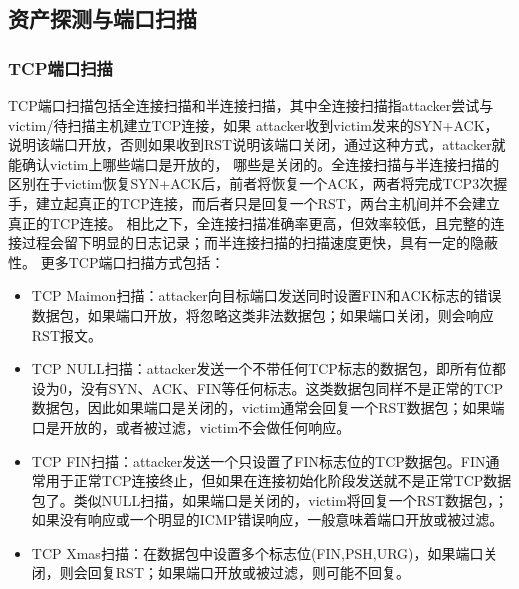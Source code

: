 \subsection{资产探测与端口扫描}
\subsubsection{TCP端口扫描}
TCP端口扫描包括全连接扫描和半连接扫描，其中全连接扫描指attacker尝试与victim/待扫描主机建立TCP连接，如果
attacker收到victim发来的SYN+ACK，说明该端口开放，否则如果收到RST说明该端口关闭，通过这种方式，attacker就能确认victim上哪些端口是开放的，
哪些是关闭的。全连接扫描与半连接扫描的区别在于victim恢复SYN+ACK后，前者将恢复一个ACK，两者将完成TCP3次握手，建立起真正的TCP连接，而后者只是回复一个RST，两台主机间并不会建立真正的TCP连接。
相比之下，全连接扫描准确率更高，但效率较低，且完整的连接过程会留下明显的日志记录；而半连接扫描的扫描速度更快，具有一定的隐蔽性。
更多TCP端口扫描方式包括：
\begin{itemize}
    \item TCP Maimon扫描：attacker向目标端口发送同时设置FIN和ACK标志的错误数据包，如果端口开放，将忽略这类非法数据包；如果端口关闭，则会响应RST报文。
    \item TCP NULL扫描：attacker发送一个不带任何TCP标志的数据包，即所有位都设为0，没有SYN、ACK、FIN等任何标志。这类数据包同样不是正常的TCP数据包，因此如果端口是关闭的，victim通常会回复一个RST数据包；如果端口是开放的，或者被过滤，victim不会做任何响应。
    \item TCP FIN扫描：attacker发送一个只设置了FIN标志位的TCP数据包。FIN通常用于正常TCP连接终止，但如果在连接初始化阶段发送就不是正常TCP数据包了。类似NULL扫描，如果端口是关闭的，victim将回复一个RST数据包，；如果没有响应或一个明显的ICMP错误响应，一般意味着端口开放或被过滤。
    \item TCP Xmas扫描：在数据包中设置多个标志位(FIN,PSH,URG)，如果端口关闭，则会回复RST；如果端口开放或被过滤，则可能不回复。
\end{itemize}


